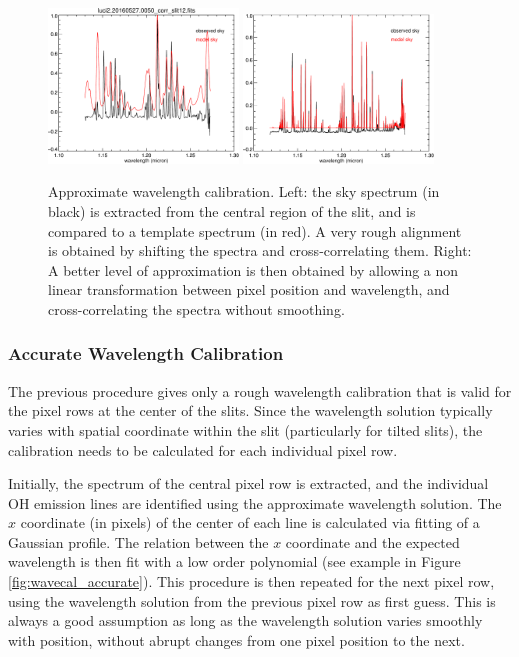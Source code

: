 \documentclass[a4paper, notitlepage]{article}
\begin{document}
\begin{figure}[tbp]
\begin{minipage}{\textwidth}
   \centering
 \includegraphics[width=0.45\textwidth]{wavecal_approx_1}
   \hspace*{0.01\textwidth}
 \includegraphics[width=0.45\textwidth]{wavecal_approx_2}
\end{minipage}
\caption{Approximate wavelength calibration. Left: the sky spectrum (in black) is extracted from the central region of the slit, and is compared to a template spectrum (in red). A very rough alignment is obtained by shifting the spectra and cross-correlating them. Right: A better level of approximation is then obtained by allowing a non linear transformation between pixel position and wavelength, and cross-correlating the spectra without smoothing.}
\label{fig:wavecal_approx}
\end{figure}


\subsubsection{Accurate Wavelength Calibration}

The previous procedure gives only a rough wavelength calibration that is valid for the pixel rows at the center of the slits. Since the wavelength solution typically varies with spatial coordinate within the slit (particularly for tilted slits), the calibration needs to be calculated for each individual pixel row.

Initially, the spectrum of the central pixel row is extracted, and the individual OH emission lines are identified using the approximate wavelength solution. The $x$ coordinate (in pixels) of the center of each line is calculated via fitting of a Gaussian profile. The relation between the $x$ coordinate and the expected wavelength is then fit with a low order polynomial (see example in Figure \ref{fig:wavecal_accurate}). This procedure is then repeated for the next pixel row, using the wavelength solution from the previous pixel row as first guess. This is always a good assumption as long as the wavelength solution varies smoothly with position, without abrupt changes from one pixel position to the next.
\end{document}
